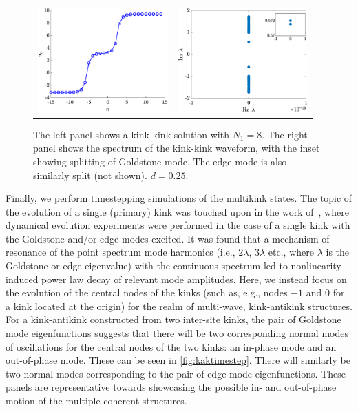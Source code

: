 \documentclass[12pt,reqno]{amsart}
\begin{document}
\begin{figure}
	\begin{center}
	\begin{tabular}{cc}
	\includegraphics[width=5cm]{kk50.eps} &
	\includegraphics[width=5cm]{kk50spec.eps}
	\end{tabular}
	\end{center}
	\caption{The left panel shows a kink-kink solution with $N_1 = 8$. The right panel shows the spectrum of the kink-kink waveform, with the inset showing splitting of Goldstone mode. The edge mode is also similarly 
	split (not shown). $d = 0.25$. }
	\label{fig:kk50}
\end{figure}

Finally, we perform timestepping simulations of the multikink
states. The topic of the evolution of
a single (primary) kink was touched upon in the work
of~\cite{KevrekidisWeinstein2000}, where dynamical
evolution experiments were performed in the case
of a single kink with the Goldstone and/or edge
modes excited. It was found that a mechanism of
resonance of the point spectrum mode harmonics
(i.e., $2 \lambda$, $3 \lambda$ etc., 
where $\lambda$ is the Goldstone
or edge eigenvalue) with the continuous spectrum
led to nonlinearity-induced power law decay of
relevant mode amplitudes. Here, we instead focus on the evolution
of the central nodes of the kinks (such as, e.g., nodes
$-1$ and $0$ for a kink located at the origin) for the
realm of multi-wave, kink-antikink structures.
For a kink-antikink constructed from two inter-site kinks, the pair of Goldstone mode eigenfunctions suggests that there will be two corresponding normal modes of oscillations for the central nodes of the two kinks: an in-phase mode and an out-of-phase mode. These can be seen in \cref{fig:kaktimestep}. There will similarly be two normal modes corresponding to the pair of edge mode eigenfunctions.
These panels are representative towards showcasing
the possible in- and out-of-phase motion of the multiple 
coherent structures.
\end{document}
